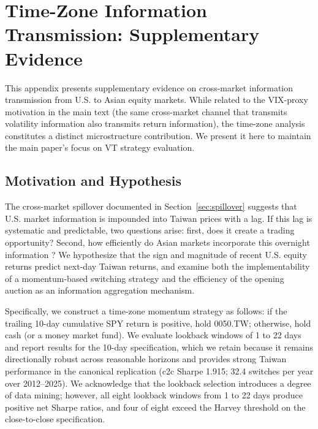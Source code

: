 \appendix

\section{Time-Zone Information Transmission: Supplementary Evidence}
\label{app:tz}

This appendix presents supplementary evidence on cross-market information transmission from U.S. to Asian equity markets. While related to the VIX-proxy motivation in the main text (the same cross-market channel that transmits volatility information also transmits return information), the time-zone analysis constitutes a distinct microstructure contribution. We present it here to maintain the main paper's focus on VT strategy evaluation.

\subsection{Motivation and Hypothesis}

The cross-market spillover documented in Section~\ref{sec:spillover} suggests that U.S. market information is impounded into Taiwan prices with a lag. If this lag is systematic and predictable, two questions arise: first, does it create a trading opportunity? Second, how efficiently do Asian markets incorporate this overnight information \citep{barclay2003}? We hypothesize that the sign and magnitude of recent U.S. equity returns predict next-day Taiwan returns, and examine both the implementability of a momentum-based switching strategy and the efficiency of the opening auction as an information aggregation mechanism.

Specifically, we construct a time-zone momentum strategy as follows: if the trailing 10-day cumulative SPY return is positive, hold 0050.TW; otherwise, hold cash (or a money market fund). We evaluate lookback windows of 1 to 22 days and report results for the 10-day specification, which we retain because it remains directionally robust across reasonable horizons and provides strong Taiwan performance in the canonical replication (c2c Sharpe 1.915; 32.4 switches per year over 2012--2025). We acknowledge that the lookback selection introduces a degree of data mining; however, all eight lookback windows from 1 to 22 days produce positive net Sharpe ratios, and four of eight exceed the Harvey threshold on the close-to-close specification.

